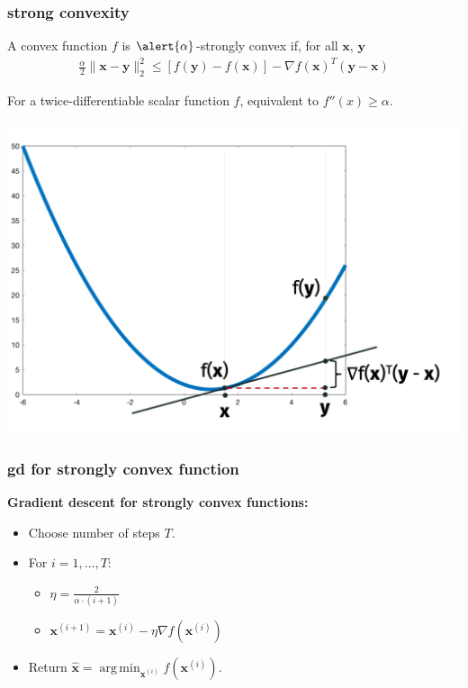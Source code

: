 \documentclass[compress]{beamer}
\newcommand{\bv}[1]{\mathbf{#1}}
\DeclareMathOperator*{\argmin}{arg\,min}
\begin{document}
\begin{frame}[t]
	\frametitle{strong convexity}
	\begin{definition}
		A convex function $f$ is $\alert{\alpha}$-strongly convex if, for all $\bv{x}$, $\bv{y}$
		\begin{align*}
			\frac{\alpha}{2}\|\bv{x} - \bv{y}\|_2^2  \leq \left[f(\bv{y}) - f(\bv{x})\right] - \nabla f(\bv{x})^T(\bv{y} - \bv{x})
		\end{align*}
	\end{definition}
	For a twice-differentiable scalar function $f$, equivalent to $f''(x) \geq \alpha$.  
	\vspace{-2em}
	\begin{center}
	\includegraphics[width=.6\textwidth]{smoothness_image.png}
\end{center}	

\end{frame}



\begin{frame}[t]
	\frametitle{gd for strongly convex function}
	\textbf{Gradient descent for strongly convex functions:}
	\begin{itemize}
		\item Choose number of steps $T$.
		\item For $i = 1,\ldots, T$:
		\begin{itemize}
			\item $\eta = \frac{2}{\alpha\cdot(i+1)}$
			\item $\bv{x}^{(i+1)} = \bv{x}^{(i)} - \eta \nabla f(\bv{x}^{(i)})$
		\end{itemize}
		\item Return $\hat{\bv{x}} = \argmin_{\bv{x}^{(i)}} f(\bv{x}^{(i)})$. 
	\end{itemize}
\end{frame}
\end{document}
